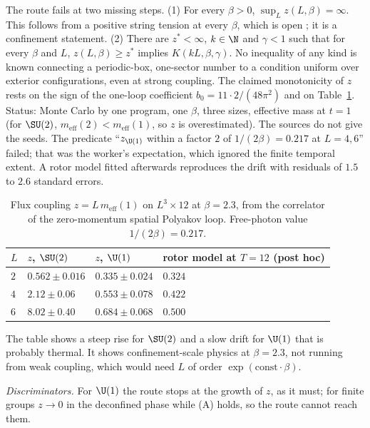 \begin{observation}\label{neg:obs-fs}
The route fails at two missing steps.
\textup{(1)} For every $\beta>0$, $\sup_Lz(L,\beta)=\infty$. This follows from a positive string
tension at every $\beta$, which is open \cite{Ch21}; it is a confinement statement.
\textup{(2)} There are $z^*<\infty$, $k\in\N$ and $\gamma<1$ such that for every $\beta$ and $L$,
$z(L,\beta)\ge z^*$ implies $K(kL,\beta,\gamma)$. No inequality of any kind is known connecting
a periodic-box, one-sector number to a condition uniform over exterior configurations, even at
strong coupling.
The claimed monotonicity of $z$ rests on the sign of the one-loop coefficient
$b_0=11\cdot2/(48\pi^2)$ and on Table~\ref{neg:tab-fs}. Status: Monte Carlo by one program, one
$\beta$, three sizes, effective mass at $t=1$ (for $\SU(2)$, $m_{\mathrm{eff}}(2)<m_{\mathrm{eff}}(1)$,
so $z$ is overestimated). The sources do not give the seeds. The predicate ``$z_{\U(1)}$ within a
factor $2$ of $1/(2\beta)=0.217$ at $L=4,6$'' failed; that was the worker's expectation, which
ignored the finite temporal extent. A rotor model fitted afterwards reproduces the drift with
residuals of $1.5$ to $2.6$ standard errors.
\end{observation}

\begin{table}[ht]
\centering
\small
\begin{tabular}{@{}llll@{}}
\toprule
$L$ & $z$, $\SU(2)$ & $z$, $\U(1)$ & rotor model at $T=12$ (post hoc) \\
\midrule
$2$ & $0.562\pm0.016$ & $0.335\pm0.024$ & $0.324$ \\
$4$ & $2.12\pm0.06$ & $0.553\pm0.078$ & $0.422$ \\
$6$ & $8.02\pm0.40$ & $0.684\pm0.068$ & $0.500$ \\
\bottomrule
\end{tabular}
\caption{Flux coupling $z=L\,m_{\mathrm{eff}}(1)$ on $L^3\times12$ at $\beta=2.3$, from the
correlator of the zero-momentum spatial Polyakov loop. Free-photon value $1/(2\beta)=0.217$.}
\label{neg:tab-fs}
\end{table}

The table shows a steep rise for $\SU(2)$ and a slow drift for $\U(1)$ that is probably thermal.
It shows confinement-scale physics at $\beta=2.3$, not running from weak coupling, which would
need $L$ of order $\exp(\mathrm{const}\cdot\beta)$.

\emph{Discriminators.} For $\U(1)$ the route stops at the growth of $z$, as it must; for finite
groups $z\to0$ in the deconfined phase while (A) holds, so the route cannot reach them.

